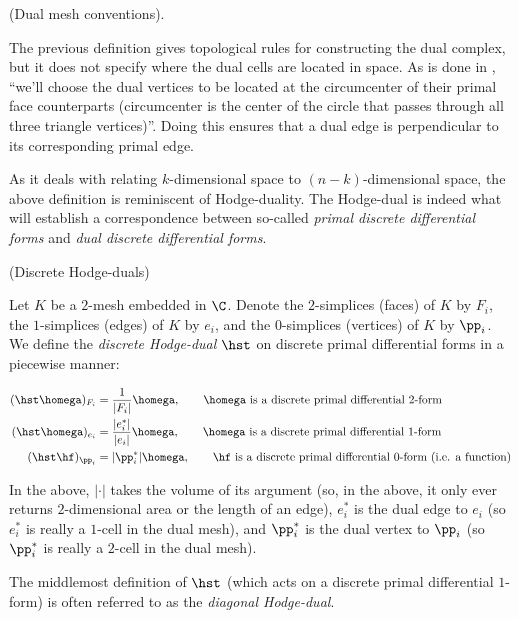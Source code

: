 \begin{defn}
    \scriptsize \cite{DDGNotes} \normalsize (Dual mesh conventions).

    The previous definition gives topological rules for constructing the dual complex, but it does not specify where the dual cells are located in space. As is done in \cite{DDGNotes}, ``we’ll choose the dual vertices to be located at the circumcenter of their primal face counterparts (circumcenter is the center of the circle that passes through all three triangle vertices)''. Doing this ensures that a dual edge is perpendicular to its corresponding primal edge.
\end{defn}

As it deals with relating $k$-dimensional space to $(n - k)$-dimensional space, the above definition is reminiscent of Hodge-duality. The Hodge-dual is indeed what will establish a correspondence between so-called \textit{primal discrete differential forms} and \textit{dual discrete differential forms}. 

\begin{defn}
\label{ch::ddg::defn::discrete_hodge_dual}
    \scriptsize \cite{DDGNotes} \normalsize (Discrete Hodge-duals)
    
    Let $K$ be a $2$-mesh embedded in $\C$. Denote the $2$-simplices (faces) of $K$ by $F_i$, the $1$-simplices (edges) of $K$ by $e_i$, and the $0$-simplices (vertices) of $K$ by $\pp_i$. We define the \textit{discrete Hodge-dual} $\hst$ on discrete primal differential forms in a piecewise manner:
    
    \begin{align*}
        (\hst \homega)_{F_i} &= \frac{1}{|F_i|} \homega, \quad \quad \text{$\homega$ is a discrete primal differential $2$-form}\\
        (\hst \homega)_{e_i} &= \frac{|e_i^*|}{|e_i|} \homega, \quad \quad \text{$\homega$ is a discrete primal differential $1$-form} \\
        (\hst \hf)_{\pp_i} &= |\pp_i^*| \homega, \quad \quad \text{$\hf$ is a discrete primal differential $0$-form (i.e. a function)}
    \end{align*}

    In the above, $|\cdot|$ takes the volume of its argument (so, in the above, it only ever returns $2$-dimensional area or the length of an edge), $e_i^*$ is the dual edge to $e_i$ (so $e_i^*$ is really a $1$-cell in the dual mesh), and $\pp_i^*$ is the dual vertex to $\pp_i$ (so $\pp_i^*$ is really a $2$-cell in the dual mesh).
    
    The middlemost definition of $\hst$ (which acts on a discrete primal differential $1$-form) is often referred to as the \textit{diagonal Hodge-dual}.
\end{defn}

